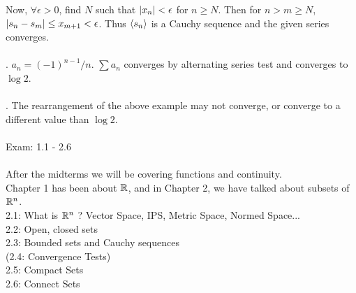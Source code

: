 Now, $\forall\epsilon>0$, find $N$ such that $\left|x_n\right|<\epsilon$ for $n\geq N$. Then for $n> m\geq N$, $\left|s_n-s_m\right| \leq x_{m+1} < \epsilon$. Thus $\left\langle s_n \right\rangle$ is a Cauchy sequence and the given series converges.\\
\\
\ex. $a_n = (-1)^{n-1}/n$. $\sum a_n$ converges by alternating series test and converges to $\log 2$.\\
\\
\rmk. The rearrangement of the above example may not converge, or converge to a different value than $\log 2$.\\
\\
Exam: 1.1 - 2.6\\
\\
After the midterms we will be covering functions and continuity.\\
Chapter 1 has been about $\mathbb{R}$, and in Chapter 2, we have talked about subsets of $\mathbb{R}^n$.\\
2.1: What is $\mathbb{R}^n$ ? Vector Space, IPS, Metric Space, Normed Space...\\
2.2: Open, closed sets\\
2.3: Bounded sets and Cauchy sequences\\
(2.4: Convergence Tests)\\
2.5: Compact Sets\\
2.6: Connect Sets\\



\pagebreak
